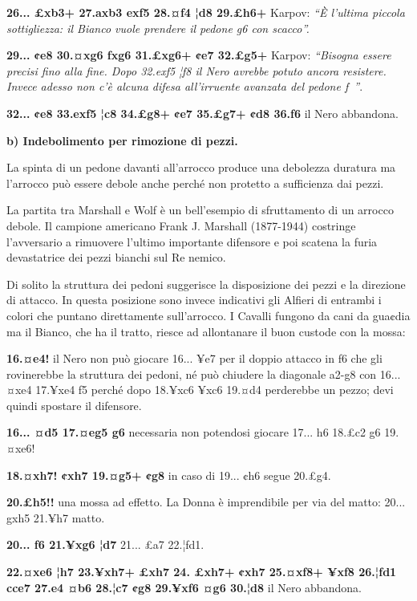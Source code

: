 \textbf{26... £xb3+ 27.axb3 exf5 28.¤f4 ¦d8 29.£h6+} Karpov: \emph{``È
l'ultima piccola sottigliezza: il Bianco vuole prendere il pedone g6 con
scacco''.}

\textbf{29... ¢e8 30.¤xg6 fxg6 31.£xg6+ ¢e7 32.£g5+} Karpov:
\emph{``Bisogna essere precisi fino alla fine. Dopo 32.exf5 ¦f8 il Nero
avrebbe potuto ancora resistere. Invece adesso non c'è alcuna difesa
all'irruente avanzata del pedone f~''}.

\textbf{32... ¢e8 33.exf5 ¦c8 34.£g8+ ¢e7 35.£g7+ ¢d8 36.f6} il Nero
abbandona.

\textbf{b) Indebolimento per rimozione di pezzi.}

La spinta di un pedone davanti all'arrocco produce una debolezza
duratura ma l'arrocco può essere debole anche perché non protetto a
sufficienza dai pezzi.

La partita tra Marshall e Wolf è un bell'esempio di sfruttamento di un
arrocco debole. Il campione americano Frank J. Marshall (1877-1944)
costringe l'avversario a rimuovere l'ultimo importante difensore e poi
scatena la furia devastatrice dei pezzi bianchi sul Re nemico.


Di solito la struttura dei pedoni suggerisce la disposizione dei pezzi e
la direzione di attacco. In questa posizione sono invece indicativi gli
Alfieri di entrambi i colori che puntano direttamente sull'arrocco. I
Cavalli fungono da cani da gua¢dia ma il Bianco, che ha il tratto,
riesce ad allontanare il buon custode con la mossa:

\textbf{16.¤e4!} il Nero non può giocare 16... ¥e7 per il doppio attacco
in f6 che gli rovinerebbe la struttura dei pedoni, né può chiudere la
diagonale a2-g8 con 16... ¤xe4 17.¥xe4 f5 perché dopo 18.¥xc6 ¥xc6
19.¤d4 perderebbe un pezzo; devi quindi spostare il difensore.

\textbf{16... ¤d5 17.¤eg5 g6} necessaria non potendosi giocare 17... h6
18.£c2 g6 19.¤xe6!

\textbf{18.¤xh7! ¢xh7 19.¤g5+ ¢g8} in caso di 19... ¢h6 segue 20.£g4.

\textbf{20.£h5!!} una mossa ad effetto. La Donna è imprendibile per via
del matto: 20... gxh5 21.¥h7 matto.

\textbf{20... f6 21.¥xg6 ¦d7} 21... £a7 22.¦fd1.

\textbf{22.¤xe6 ¦h7 23.¥xh7+ £xh7 24. £xh7+ ¢xh7 25.¤xf8+ ¥xf8 26.¦fd1
cce7 27.e4 ¤b6 28.¦c7 ¢g8 29.¥xf6 ¤g6 30.¦d8} il Nero abbandona.

